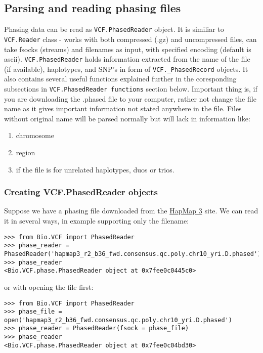 \subsection{Parsing and reading phasing files}

Phasing data can be read as \verb|VCF.PhasedReader| object. It is similiar to \verb|VCF.Reader| class - works with both compressed (.gz) and
uncompressed files, can take fsocks (streams) and filenames as input, with specified encoding (default is ascii).
\verb|VCF.PhasedReader| holds information extracted from the name of the file (if available), haplotypes, and SNP's in form of \verb|VCF._PhasedRecord| objects.
It also contains several useful functions explained further in the coresponding subsections in \verb|VCF.PhasedReader functions| section below.
Important thing is, if you are downloading the .phased file to your computer, rather not change the file name as it gives important
information not stated anywhere in the file. Files without original name will be parsed normally but will lack in information like:
\begin{enumerate}
  \item chromosome
  \item region
  \item if the file is for unrelated haplotypes, duos or trios.
\end{enumerate}

\subsubsection{Creating VCF.PhasedReader objects}

\noindent Suppose we have a phasing file downloaded from the \href{ftp://ftp.hapmap.org/hapmap/phasing/2009-02\_phaseIII/HapMap3\_r2/}{HapMap 3} site.
We can read it in several ways, in example supporting only the filename:

\begin{verbatim}
>>> from Bio.VCF import PhasedReader
>>> phase_reader = PhasedReader('hapmap3_r2_b36_fwd.consensus.qc.poly.chr10_yri.D.phased')
>>> phase_reader
<Bio.VCF.phase.PhasedReader object at 0x7fee0c0445c0>

\end{verbatim}

\noindent or with opening the file first:

\begin{verbatim}
>>> from Bio.VCF import PhasedReader
>>> phase_file = open('hapmap3_r2_b36_fwd.consensus.qc.poly.chr10_yri.D.phased')
>>> phase_reader = PhasedReader(fsock = phase_file)
>>> phase_reader
<Bio.VCF.phase.PhasedReader object at 0x7fee0c04bd30>

\end{verbatim}

